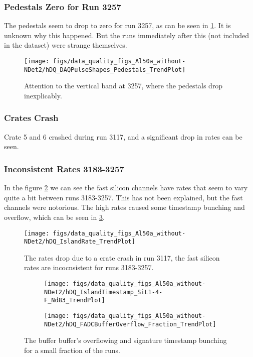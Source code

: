 \documentclass[a4paper]{article}
\begin{document}
\subsubsection{Pedestals Zero for Run 3257}
\label{sec:al50a_ped_zero}
The pedestals seem to drop to zero for run 3257, as can be seen in \ref{fig:al50a_ped}. It is unknown
why this happened. But the runs immediately after this (not included in the dataset) were strange themselves.

\begin{figure}
  \centering
  \texttt{[image: figs/data\_quality\_figs\_Al50a\_without-NDet2/hDQ\_DAQPulseShapes\_Pedestals\_TrendPlot]}
  \caption{Attention to the vertical band at 3257, where the pedestals drop inexplicably.}
  \label{fig:al50a_ped}
\end{figure}

\subsubsection{Crates Crash}
\label{sec:al50a_crate_crash}
Crate 5 and 6 crashed during run 3117, and a significant drop in rates can be seen.

\subsubsection{Inconsistent Rates 3183-3257}
\label{sec:al50a_rates}
In the figure \ref{fig:al50a_rates} we can see the fast silicon channels have rates that seem to vary quite a bit between runs 3183-3257.
This has not been explained, but the fast channels were notorious. The high rates caused some timestamp bunching and overflow, which
can be seen in \ref{fig:al50a_overflow}.

\begin{figure}
  \centering
  \texttt{[image: figs/data\_quality\_figs\_Al50a\_without-NDet2/hDQ\_IslandRate\_TrendPlot]}
  \caption{The rates drop due to a crate crash in run 3117, the fast silicon rates are incocnsistent for runs 3183-3257.}
  \label{fig:al50a_rates}
\end{figure}

\begin{figure}
  \centering
  \begin{subfigure}{0.5\textwidth}
    \texttt{[image: figs/data\_quality\_figs\_Al50a\_without-NDet2/hDQ\_IslandTimestamp\_SiL1-4-F\_Nd83\_TrendPlot]}
  \end{subfigure}%
  \begin{subfigure}{0.5\textwidth}
    \texttt{[image: figs/data\_quality\_figs\_Al50a\_without-NDet2/hDQ\_FADCBufferOverflow\_Fraction\_TrendPlot]}
  \end{subfigure}
  \caption{The buffer buffer's overflowing and signature timestamp bunching for a small fraction of the runs.}
  \label{fig:al50a_overflow}
\end{figure}
\end{document}
